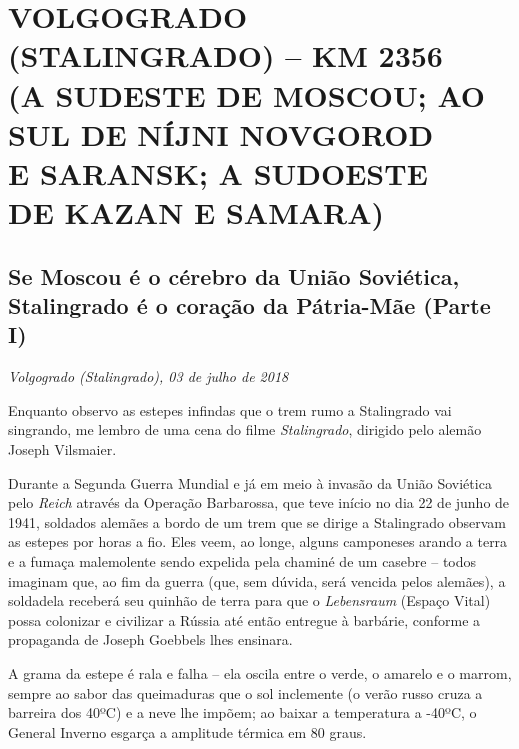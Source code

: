 \movetooddpage
{}
\part*{VOLGOGRADO (STALINGRADO) -- KM 2356\\(A SUDESTE DE MOSCOU; AO\\SUL DE NÍJNI NOVGOROD\\E SARANSK; A SUDOESTE\\DE KAZAN E SAMARA)}


\chapter*{Se Moscou é o cérebro da União Soviética, Stalingrado é o coração da Pátria-Mãe (Parte I)}

\begin{flushright}
\emph{Volgogrado (Stalingrado), 03 de julho de 2018}
\end{flushright}

Enquanto observo as estepes infindas que o trem rumo a Stalingrado vai
singrando, me lembro de uma cena do filme \emph{Stalingrado}, dirigido
pelo alemão Joseph Vilsmaier.

Durante a Segunda Guerra Mundial e já em meio à invasão da União
Soviética pelo  \emph{Reich} através da Operação Barbarossa, que teve
início no dia 22 de junho de 1941, soldados alemães a bordo de um trem
que se dirige a Stalingrado observam as estepes por horas a fio. Eles
veem, ao longe, alguns camponeses arando a terra e a fumaça malemolente
sendo expelida pela chaminé de um casebre -- todos imaginam que, ao fim
da guerra (que, sem dúvida, será vencida pelos alemães), a soldadela
receberá seu quinhão de terra para que o \emph{Lebensraum} (Espaço
Vital) possa colonizar e civilizar a Rússia até então entregue à
barbárie, conforme a propaganda de Joseph Goebbels lhes ensinara.

A grama da estepe é rala e falha -- ela oscila entre o verde, o amarelo
e o marrom, sempre ao sabor das queimaduras que o sol inclemente (o
verão russo cruza a barreira dos 40ºC) e a neve lhe impõem; ao baixar a
temperatura a -40ºC, o General Inverno esgarça a amplitude térmica em 80
graus.

